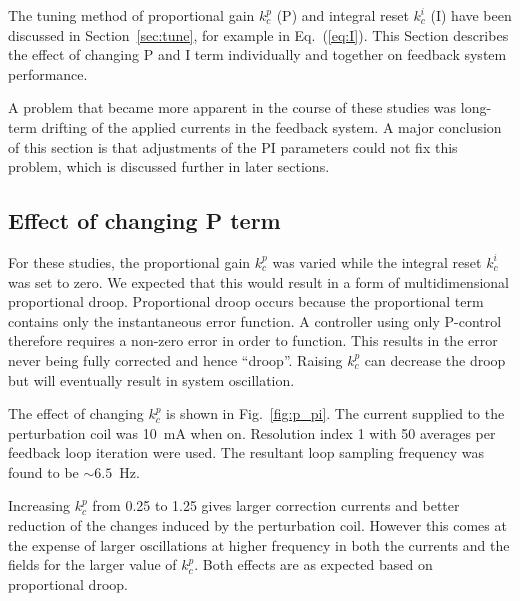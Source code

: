 The tuning method of proportional gain $k_c^p$ (P) and integral reset
$k_c^i$ (I) have been discussed in Section~\ref{sec:tune}, for example
in Eq.~(\ref{eq:I}).  This Section describes the effect of changing P
and I term individually and together on feedback system performance.

A problem that became more apparent in the course of these studies was
long-term drifting of the applied currents in the feedback system.  A
major conclusion of this section is that adjustments of the PI
parameters could not fix this problem, which is discussed further in
later sections.


\subsection{Effect of changing P term}

For these studies, the proportional gain $k_c^p$ was varied while the
integral reset $k_c^i$ was set to zero.  We expected that this would
result in a form of multidimensional proportional droop.  Proportional
droop occurs because the proportional term contains only the
instantaneous error function.  A controller using only P-control
therefore requires a non-zero error in order to function.  This
results in the error never being fully corrected and hence ``droop''.
Raising $k_c^p$ can decrease the droop but will eventually result in
system oscillation.



The effect of changing $k_c^p$ is shown in Fig.~\ref{fig:p_pi}.  The
current supplied to the perturbation coil was 10~mA when on.
Resolution index 1 with 50 averages per feedback loop iteration were
used.  The resultant loop sampling frequency was found to be $\sim
6.5$~Hz.

Increasing $k_c^p$ from 0.25 to 1.25 gives larger correction currents
and better reduction of the changes induced by the perturbation coil.
However this comes at the expense of larger oscillations at higher
frequency in both the currents and the fields for the larger value of
$k_c^p$.  Both effects are as expected based on proportional droop.

